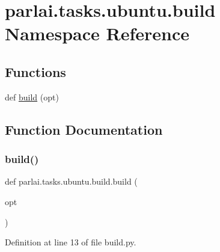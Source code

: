 \hypertarget{namespaceparlai_1_1tasks_1_1ubuntu_1_1build}{}\section{parlai.\+tasks.\+ubuntu.\+build Namespace Reference}
\label{namespaceparlai_1_1tasks_1_1ubuntu_1_1build}
\subsection*{Functions}
\begin{DoxyCompactItemize}
\item 
def \hyperlink{namespaceparlai_1_1tasks_1_1ubuntu_1_1build_aedbc80b48491ff9f08bbc5e82b9504a3}{build} (opt)
\end{DoxyCompactItemize}


\subsection{Function Documentation}
\mbox{\label{namespaceparlai_1_1tasks_1_1ubuntu_1_1build_aedbc80b48491ff9f08bbc5e82b9504a3}} 
\subsubsection{\texorpdfstring{build()}{build()}}
{\footnotesize\ttfamily def parlai.\+tasks.\+ubuntu.\+build.\+build (\begin{DoxyParamCaption}\item[{}]{opt }\end{DoxyParamCaption})}



Definition at line 13 of file build.\+py.

